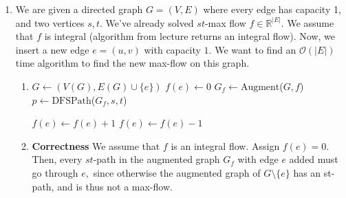 \documentclass[12pt]{article}
\begin{document}
\begin{enumerate}
\begin{enumerate}
\begin{enumerate}
          \item The total weight of the cut is $2 + 2 + 2 + 2 = 8$.
        \end{enumerate}
    \end{enumerate}

  \item We are given a directed graph $G = (V, E)$ where every edge
    has capacity 1, and two vertices $s, t.$ We've already solved
    $st$-max flow $f \in \mathbb R^{|E|}.$ We assume that $f$ is
    integral (algorithm from lecture returns an integral flow). Now,
    we insert a new edge $e = (u, v)$ with capacity $1.$ We want to
    find an $\mathcal O(|E|)$ time algorithm to find the new max-flow
    on this graph.

    \begin{enumerate}
      \item
        \begin{algorithmic}[1]
          \State $G \gets (V(G), E(G) \cup \{e\})$ 
          \State $f(e) \gets 0$ 
          \vspace{3mm}
          \State $G_f \gets \text{Augment}$($G, f$) 
          \State $p \gets \text{DFSPath}$($G_f, s, t$) 

          \vspace{3mm}
           
          \State {}
          \EndIf

          \vspace{3mm}

           
          \State $f(e) \gets f(e) + 1$
          \Else
          \State $f(e) \gets f(e) - 1$
          \EndIf
          \EndFor

          \State {}
          \EndProcedure
        \end{algorithmic}

      \item \textbf{Correctness} We assume that $f$ is an integral
        flow. Assign $f(e) = 0.$ Then, every $st$-path in the
        augmented graph $G_f$ with edge $e$ added must go through
        $e,$ since otherwise the augmented graph of $G \setminus
        \{e\}$ has an st-path, and is thus not a max-flow.


\end{enumerate}
\end{enumerate}
\end{document}
